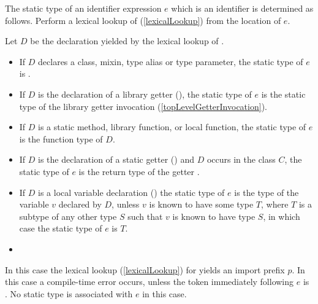 \documentclass[makeidx]{article}
\begin{document}
{\LMHash{}%
The static type of an identifier expression $e$ which is an identifier \id{}
is determined as follows.
Perform a lexical lookup of \id{}
(\ref{lexicalLookup})
from the location of $e$.

\LMHash{}%
Let $D$ be the declaration yielded by the lexical lookup of \id.

\begin{itemize}
\item
  If $D$ declares a class, mixin, type alias or type parameter,
  the static type of $e$ is .
\item
  If $D$ is the declaration of a library getter
  (),
  the static type of $e$ is the static type of the
  library getter invocation \id{}
  (\ref{topLevelGetterInvocation}).
\item
  If $D$ is a static method, library function, or local function,
  the static type of $e$ is the function type of $D$.

\item
  If $D$ is the declaration of a static getter
  ()
  and $D$ occurs in the class $C$,
  the static type of $e$ is the return type of the getter
  .
\item
  If $D$ is a local variable declaration
  ()
  the static type of $e$ is the type of the variable $v$ declared by $D$,
  unless $v$ is known to have some type $T$,
  where $T$ is a subtype of any other type $S$
  such that $v$ is known to have type $S$,
  in which case the static type of $e$ is $T$.
\item
\end{itemize}
\vspace{-1ex}
\EndCase

\LMHash{}%
In this case the lexical lookup
(\ref{lexicalLookup})
for \id{} yields an import prefix $p$.
In this case a compile-time error occurs,
unless the token immediately following $e$ is .
No static type is associated with $e$ in this case.

}
\end{document}
